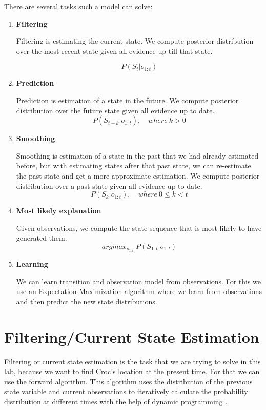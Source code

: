 \documentclass[a4paper]{article}
\begin{document}
There are several tasks such a model can solve:
\begin{enumerate}
\item \textbf{Filtering}

Filtering is estimating the current state. We compute posterior distribution over the most recent state given all evidence up till that state.

\begin{equation}
P(S_{t}|o_{1:t})
\end{equation}
\item \textbf{Prediction}

Prediction is estimation of a state in the future. We compute posterior distribution over the future state given all evidence up to date.
\begin{equation}
P(S_{t+k}|o_{1:t}), \quad where \ k>0
\end{equation}
\item \textbf{Smoothing}

Smoothing is estimation of a state in the past that we had already estimated before, but with estimating states after that past state, we can re-estimate the past state and get a more approximate estimation. We compute posterior distribution over a past state given all evidence up to date.
\begin{equation}
P(S_{k}|o_{1:t}), \quad where \ 0 \leq k<t
\end{equation}
\item \textbf{Most likely explanation}

Given observations, we compute the state sequence that is most likely to have generated them.
\begin{equation}
argmax_{s_{1:t}}\ P(S_{1:t}|o_{1:t})
\end{equation}
\item \textbf{Learning}

We can learn transition and observation model from observations. For this we use an Expectation-Maximization algorithm where we learn from observations and then predict the new state distributions.
\end{enumerate}


\section{Filtering/Current State Estimation}
Filtering or current state estimation is the task that we are trying to solve in this lab, because we want to find Croc's location at the present time. For that we can use the forward algorithm. This algorithm uses the distribution of the previous state variable and current observations to iteratively calculate the probability distribution at different times with the help of dynamic programming \citep{Ashcroft17}.
\end{document}
